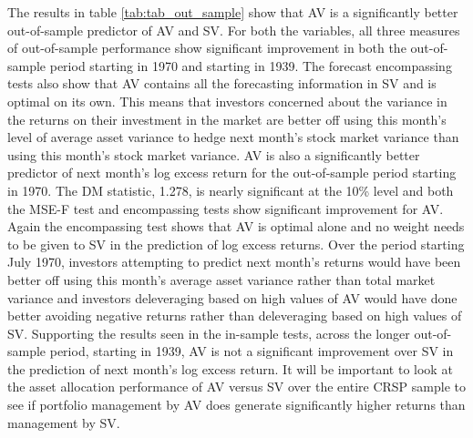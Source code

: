 The results in table \ref{tab:tab_out_sample} show that AV is a significantly better out-of-sample predictor of AV and SV. For both the variables, all three measures of out-of-sample performance show significant improvement in both the out-of-sample period starting in 1970 and starting in 1939. The forecast encompassing tests also show that AV contains all the forecasting information in SV and is optimal on its own. This means that investors concerned about the variance in the returns on their investment in the market are better off using this month's level of average asset variance to hedge next month's stock market variance than using this month's stock market variance. AV is also a significantly better predictor of next month's log excess return for the out-of-sample period starting in 1970. The DM statistic, 1.278, is nearly significant at the 10\% level and both the MSE-F test and encompassing tests show significant improvement for AV. Again the encompassing test shows that AV is optimal alone and no weight needs to be given to SV in the prediction of log excess returns. Over the period starting July 1970, investors attempting to predict next month's returns would have been better off using this month's average asset variance rather than total market variance and investors deleveraging based on high values of AV would have done better avoiding negative returns rather than deleveraging based on high values of SV. Supporting the results seen in the in-sample tests, across the longer out-of-sample period, starting in 1939, AV is not a significant improvement over SV in the prediction of next month's log excess return. It will be important to look at the asset allocation performance of AV versus SV over the entire CRSP sample to see if portfolio management by AV does generate significantly higher returns than management by SV.

